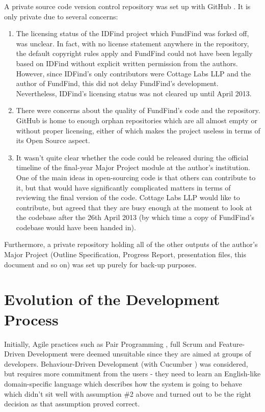 A private source code version control repository was set up with GitHub \cite{github}. It is only private due to several concerns:
\begin{enumerate}
 \item The licensing status of the IDFind project which FundFind was forked off, was unclear. In fact, with no license statement anywhere in the repository, the default copyright rules apply and FundFind could not have been legally based on IDFind without explicit written permission from the authors. However, since IDFind's only contributors were Cottage Labs LLP and the author of FundFind, this did not delay FundFind's development. Nevertheless, IDFind's licensing status was not cleared up until April 2013.
 
 \item There were concerns about the quality of FundFind's code and the repository. GitHub is home to enough orphan repositories which are all almost empty or without proper licensing, either of which makes the project useless in terms of its Open Source aspect.
 
 \item It wasn't quite clear whether the code could be released during the official timeline of the final-year Major Project module at the author's institution. One of the main ideas in open-sourcing code is that others can contribute to it, but that would have significantly complicated matters in terms of reviewing the final version of the code. Cottage Labs LLP would like to contribute, but agreed that they are busy enough at the moment to look at the codebase after the 26th April 2013 (by which time a copy of FundFind's codebase would have been handed in).
\end{enumerate}

Furthermore, a private repository holding all of the other outputs of the author's Major Project (Outline Specification, Progress Report, presentation files, this document and so on) was set up purely for back-up purposes.

\section{Evolution of the Development Process}
Initially, Agile practices such as Pair Programming \cite{pairprg}, full Scrum \cite{Scrum} and Feature-Driven Development were deemed unsuitable since they are aimed at groups of developers. Behaviour-Driven Development (with Cucumber \cite{cucumber}) was considered, but requires more commitment from the users - they need to learn an English-like domain-specific language which describes how the system is going to behave which didn't sit well with assumption \#2 above and turned out to be the right decision as that assumption proved correct.

